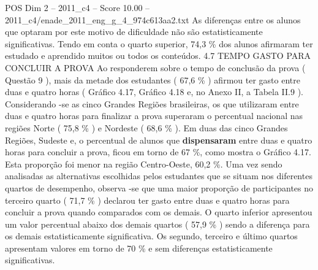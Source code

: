 \begin{textsample}{POS Dim 2 – 2011\_c4 – Score 10.00 – 2011\_c4/enade\_2011\_eng\_g\_4\_974c613aa2.txt}
As diferenças entre os alunos que optaram por este motivo de dificuldade não são estatisticamente significativas.
Tendo em conta o quarto superior, 74,3 \% dos alunos afirmaram ter estudado e aprendido muitos ou todos os conteúdos. 4.7 TEMPO GASTO PARA CONCLUIR A PROVA Ao responderem sobre o tempo de conclusão da prova ( Questão 9 ), mais da metade dos estudantes ( 67,6 \% ) afirmou ter gasto entre duas e quatro horas ( Gráfico 4.17, Gráfico 4.18 e, no Anexo II, a Tabela II.9 ).
Considerando -se as cinco Grandes Regiões brasileiras, os que utilizaram entre duas e quatro horas para finalizar a prova superaram o percentual nacional nas regiões Norte ( 75,8 \% ) e Nordeste ( 68,6 \% ).
Em duas das cinco Grandes Regiões, Sudeste e, o percentual de alunos que \textbf{dispensaram} entre duas e quatro horas para concluir a prova, ficou em torno de 67 \%, como mostra o Gráfico 4.17.
Esta proporção foi menor na região Centro-Oeste, 60,2 \%.
Uma vez sendo analisadas as alternativas escolhidas pelos estudantes que se situam nos diferentes quartos de desempenho, observa -se que uma maior proporção de participantes no terceiro quarto ( 71,7 \% ) declarou ter gasto entre duas e quatro horas para concluir a prova quando comparados com os demais.
O quarto inferior apresentou um valor percentual abaixo dos demais quartos ( 57,9 \% ) sendo a diferença para os demais estatisticamente significativa.
Os segundo, terceiro e último quartos apresentam valores em torno de 70 \% e sem diferenças estatisticamente significativas.

\end{textsample}
